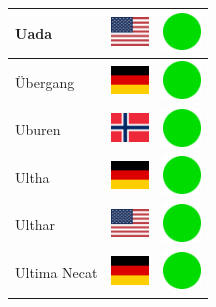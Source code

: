 \documentclass[12pt, a4paper, twoside]{report}
\begin{document}
\begin{center}
\begin{longtable}{|p{5cm}|p{2cm}|p{2cm}|}
 Uada                                                       & \includegraphics[width=1cm]{../img/flags/us} &   \includegraphics[width=1cm]{../likes/y} \\ \hline
 Übergang                                                   & \includegraphics[width=1cm]{../img/flags/de} &   \includegraphics[width=1cm]{../likes/y} \\ \hline
 Uburen                                                     & \includegraphics[width=1cm]{../img/flags/no} &   \includegraphics[width=1cm]{../likes/y} \\ \hline
 Ultha                                                      & \includegraphics[width=1cm]{../img/flags/de} &   \includegraphics[width=1cm]{../likes/y} \\ \hline
 Ulthar                                                     & \includegraphics[width=1cm]{../img/flags/us} &   \includegraphics[width=1cm]{../likes/y} \\ \hline
 Ultima Necat                                               & \includegraphics[width=1cm]{../img/flags/de} &   \includegraphics[width=1cm]{../likes/y} \\ \hline

\end{longtable}
\end{center}
\end{document}
